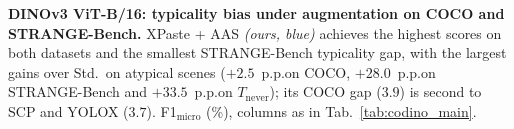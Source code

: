 \begin{table}[t]
\centering
\small
\caption{\textbf{DINOv3 ViT-B/16: typicality bias under augmentation
on COCO and STRANGE-Bench.} XPaste + AAS \emph{(ours, blue)} achieves
the highest scores on both datasets and the smallest STRANGE-Bench typicality gap, with the largest gains over Std.\ on atypical scenes ($+2.5$~p.p.\@ on COCO, $+28.0$~p.p.\@ on STRANGE-Bench and $+33.5$~p.p.\@ on $T_{\text{never}}$); its COCO gap ($3.9$) is second to SCP and YOLOX ($3.7$). F1$_{\text{micro}}$ (\%), columns as in Tab.~\ref{tab:codino_main}.}
\label{tab:dinov3_main}
\vspace{-2pt}

\vspace{-10pt}
\end{table}
